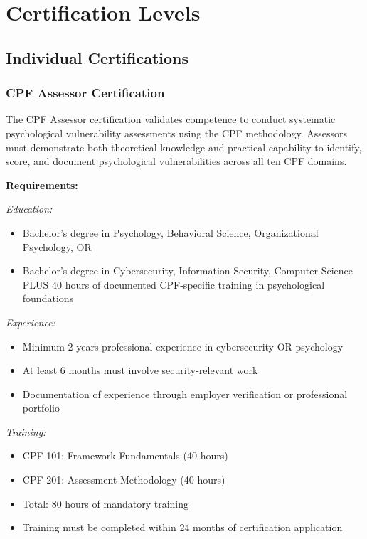 \documentclass[11pt,a4paper]{article}
\begin{document}
\section{Certification Levels}

\subsection{Individual Certifications}

\subsubsection{CPF Assessor Certification}

The CPF Assessor certification validates competence to conduct systematic psychological vulnerability assessments using the CPF methodology. Assessors must demonstrate both theoretical knowledge and practical capability to identify, score, and document psychological vulnerabilities across all ten CPF domains.

\textbf{Requirements:}

\textit{Education:}
\begin{itemize}
\item Bachelor's degree in Psychology, Behavioral Science, Organizational Psychology, OR
\item Bachelor's degree in Cybersecurity, Information Security, Computer Science PLUS 40 hours of documented CPF-specific training in psychological foundations
\end{itemize}

\textit{Experience:}
\begin{itemize}
\item Minimum 2 years professional experience in cybersecurity OR psychology
\item At least 6 months must involve security-relevant work
\item Documentation of experience through employer verification or professional portfolio
\end{itemize}

\textit{Training:}
\begin{itemize}
\item CPF-101: Framework Fundamentals (40 hours)
\item CPF-201: Assessment Methodology (40 hours)
\item Total: 80 hours of mandatory training
\item Training must be completed within 24 months of certification application
\end{itemize}
\end{document}

